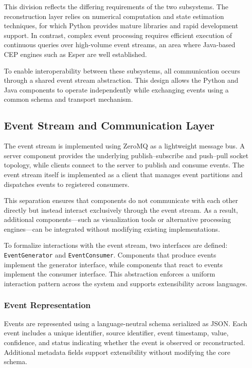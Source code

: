 This division reflects the differing requirements of the two subsystems. The reconstruction layer relies on numerical computation and state estimation techniques, for which Python provides mature libraries and rapid development support. In contrast, complex event processing requires efficient execution of continuous queries over high-volume event streams, an area where Java-based CEP engines such as Esper are well established.

To enable interoperability between these subsystems, all communication occurs through a shared event stream abstraction. This design allows the Python and Java components to operate independently while exchanging events using a common schema and transport mechanism.

\subsection{Event Stream and Communication Layer}

The event stream is implemented using ZeroMQ as a lightweight message bus. A server component provides the underlying publish–subscribe and push–pull socket topology, while clients connect to the server to publish and consume events. The event stream itself is implemented as a client that manages event partitions and dispatches events to registered consumers.

This separation ensures that components do not communicate with each other directly but instead interact exclusively through the event stream. As a result, additional components—such as visualization tools or alternative processing engines—can be integrated without modifying existing implementations.

To formalize interactions with the event stream, two interfaces are defined: \texttt{EventGenerator} and \texttt{EventConsumer}. Components that produce events implement the generator interface, while components that react to events implement the consumer interface. This abstraction enforces a uniform interaction pattern across the system and supports extensibility across languages.

\subsubsection{Event Representation}

Events are represented using a language-neutral schema serialized as JSON. Each event includes a unique identifier, source identifier, event timestamp, value, confidence, and status indicating whether the event is observed or reconstructed. Additional metadata fields support extensibility without modifying the core schema.

